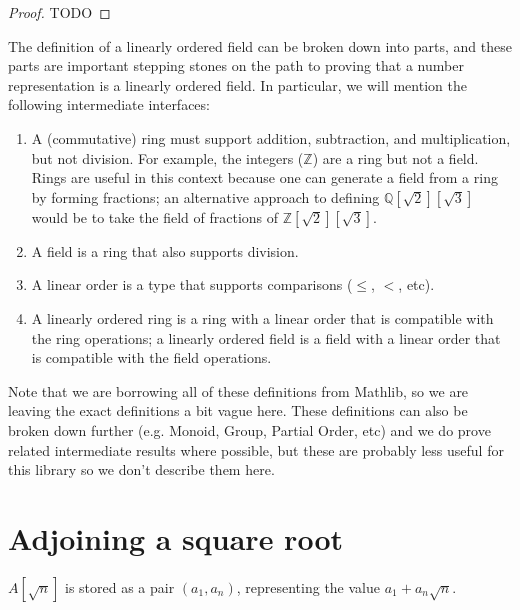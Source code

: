 \begin{proof}
  TODO
\end{proof}

The definition of a linearly ordered field can be broken down into parts, and
these parts are important stepping stones on the path to proving that a number
representation is a linearly ordered field. In particular, we will mention the
following intermediate interfaces:

\begin{enumerate}
\item A (commutative) ring must support addition, subtraction, and
multiplication, but not division. For example, the integers ($ℤ$) are a ring
but not a field. Rings are useful in this context because one can generate a
field from a ring by forming fractions; an alternative approach to defining
$ℚ[\sqrt{2}][\sqrt{3}]$ would be to take the field of fractions of
$ℤ[\sqrt{2}][\sqrt{3}]$.

\item A field is a ring that also supports division.

\item A linear order is a type that supports comparisons ($≤$, $<$, etc).

\item A linearly ordered ring is a ring with a linear order that is compatible
with the ring operations; a linearly ordered field is a field with a linear
order that is compatible with the field operations.
\end{enumerate}

Note that we are borrowing all of these definitions from Mathlib, so we are
leaving the exact definitions a bit vague here.  These definitions can also be
broken down further (e.g. Monoid, Group, Partial Order, etc) and we do prove
related intermediate results where possible, but these are probably less useful
for this library so we don't describe them here.

\section{Adjoining a square root}


\begin{definition}
  \label{def:adjoin}
  \leanok
  $A[\sqrt{n}]$ is stored as a pair $(a_1, a_n)$, representing the value
  $a_1 + a_n\sqrt{n}$.
\end{definition}

